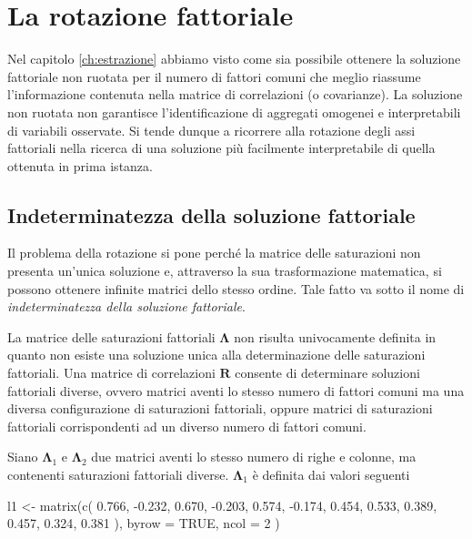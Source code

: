 \documentclass[
  11pt,
]{krantz}
\makeatletter
\newenvironment{Shaded}{\begin{snugshade}}{\end{snugshade}}
\newcommand{\AttributeTok}[1]{\textcolor[rgb]{0.61,0.61,0.61}{#1}}
\newcommand{\ConstantTok}[1]{\textcolor[rgb]{0,0,0}{#1}}
\newcommand{\DecValTok}[1]{\textcolor[rgb]{0.06,0.06,0.06}{#1}}
\newcommand{\FloatTok}[1]{\textcolor[rgb]{0.06,0.06,0.06}{#1}}
\newcommand{\FunctionTok}[1]{\textcolor[rgb]{0,0,0}{#1}}
\newcommand{\NormalTok}[1]{#1}
\newcommand{\OtherTok}[1]{\textcolor[rgb]{0.37,0.37,0.37}{#1}}
\newcommand{\SpecialCharTok}[1]{\textcolor[rgb]{0,0,0}{#1}}
\newenvironment{kframe}{%
\medskip{}
\setlength{\fboxsep}{.8em}
 \def\at@end@of@kframe{}%
 \ifinner\ifhmode%
  \def\at@end@of@kframe{\end{minipage}}%
  \begin{minipage}{\columnwidth}%
 \fi\fi%
 \def\FrameCommand##1{\hskip\@totalleftmargin \hskip-\fboxsep
 \colorbox{shadecolor}{##1}\hskip-\fboxsep
     \hskip-\linewidth \hskip-\@totalleftmargin \hskip\columnwidth}%
 \MakeFramed {\advance\hsize-\width
   \@totalleftmargin\z@ \linewidth\hsize
   \@setminipage}}%
 {\par\unskip\endMakeFramed%
 \at@end@of@kframe}
\renewenvironment{Shaded}{\begin{kframe}}{\end{kframe}}
\theoremstyle{definition}
\theoremstyle{definition}
\theoremstyle{definition}
\theoremstyle{definition}
\theoremstyle{remark}
\makeatother
\begin{document}
\hypertarget{ch:rotazione}{%
\chapter{La rotazione fattoriale}\label{ch:rotazione}}

Nel capitolo \ref{ch:estrazione} abbiamo visto come sia possibile ottenere la soluzione fattoriale non ruotata per il numero di fattori comuni che meglio riassume l'informazione contenuta nella matrice di correlazioni (o covarianze). La soluzione non ruotata non garantisce l'identificazione di aggregati omogenei e interpretabili di variabili osservate. Si tende dunque a ricorrere alla rotazione degli assi fattoriali nella ricerca di una soluzione più facilmente interpretabile di quella ottenuta in prima istanza.

\hypertarget{indeterminatezza-della-soluzione-fattoriale}{%
\section{Indeterminatezza della soluzione fattoriale}\label{indeterminatezza-della-soluzione-fattoriale}}

Il problema della rotazione si pone perché la matrice delle saturazioni non presenta un'unica soluzione e, attraverso la sua trasformazione matematica, si possono ottenere infinite matrici dello stesso ordine. Tale fatto va sotto il nome di \emph{indeterminatezza della soluzione fattoriale}.

La matrice delle saturazioni fattoriali \(\boldsymbol{\Lambda}\) non risulta univocamente definita in quanto non esiste una soluzione unica alla determinazione delle saturazioni fattoriali. Una matrice di correlazioni \(\boldsymbol{R}\) consente di determinare soluzioni fattoriali diverse, ovvero matrici aventi lo stesso numero di fattori comuni ma una diversa configurazione di saturazioni fattoriali, oppure matrici di saturazioni fattoriali corrispondenti ad un diverso numero di fattori comuni.

Siano \(\boldsymbol{\Lambda}_1\) e \(\boldsymbol{\Lambda}_2\) due matrici aventi lo stesso numero di righe e colonne, ma contenenti saturazioni fattoriali diverse. \(\boldsymbol{\Lambda}_1\) è definita dai valori seguenti

\begin{Shaded}
\begin{Highlighting}[]
\NormalTok{l1 }\OtherTok{\textless{}{-}} \FunctionTok{matrix}\NormalTok{(}\FunctionTok{c}\NormalTok{(}
  \FloatTok{0.766}\NormalTok{,  }\SpecialCharTok{{-}}\FloatTok{0.232}\NormalTok{,}
  \FloatTok{0.670}\NormalTok{,  }\SpecialCharTok{{-}}\FloatTok{0.203}\NormalTok{,}
  \FloatTok{0.574}\NormalTok{,  }\SpecialCharTok{{-}}\FloatTok{0.174}\NormalTok{,}
  \FloatTok{0.454}\NormalTok{,   }\FloatTok{0.533}\NormalTok{,}
  \FloatTok{0.389}\NormalTok{,   }\FloatTok{0.457}\NormalTok{,}
  \FloatTok{0.324}\NormalTok{,   }\FloatTok{0.381}
\NormalTok{),}
\AttributeTok{byrow =} \ConstantTok{TRUE}\NormalTok{, }\AttributeTok{ncol =} \DecValTok{2}
\NormalTok{)}
\end{Highlighting}
\end{Shaded}
\end{document}
